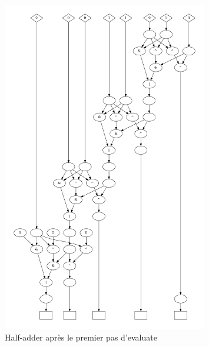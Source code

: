 \documentclass[a4paper,12pt]{article}
\begin{document}
\begin{figure}[H]
    \centering
    \includegraphics[width=0.8\textwidth]{figures/half_adder/debug_evualte_0-1.png}
    \caption{Half-adder après le premier pas d'evaluate}
    \label{fig:half-adder-apres-le-premier-pas-devaluate}
\end{figure}
\end{document}
